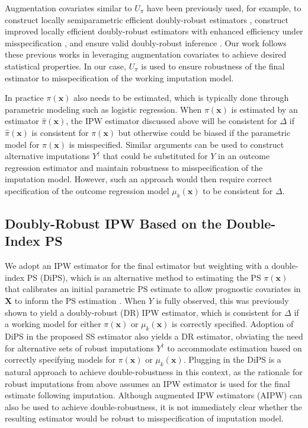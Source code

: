 \documentclass[useAMS,referee,usenatbib]{biom}
\def\bx{\mathbf{x}}
\def\bX{\mathbf{X}}
\def\Ydag{Y^{\dagger}}
\def\pihat{\widehat{\pi}}
\begin{document}
Augmentation covariates similar to $U_{\pi}$ have been previously used, for example, to construct locally semiparametric efficient doubly-robust estimators 
\citep{van2006targeted,bang2005doubly}, construct improved locally efficient doubly-robust estimators 
with enhanced efficiency under misspecification \citep{rotnitzky2012improved}, and ensure valid doubly-robust inference \citep{benkeser2017doubly}.
Our work follows these previous works in leveraging augmentation covariates to achieve desired statistical properties.
In our case, $U_{\pi}$ is used to ensure robustness of the final estimator to misspecification of the working imputation model.

In practice $\pi(\bx)$ also needs to be estimated, which is typically done through parametric modeling such as logistic regression.  When $\pi(\bx)$ is estimated by an estimator $\pihat(\bx)$, the IPW estimator discussed above will be consistent for $\Delta$ if $\pihat(\bx)$ is consistent for $\pi(\bx)$ but otherwise could be biased if the parametric model for $\pi(\bx)$ is misspecified.  
Similar arguments can be used to construct alternative imputations $\Ydag$ that could be substituted for $Y$ in an outcome regression estimator and maintain robustness to misspecification of the imputation model.  However, such an approach would then require correct specification of the outcome regression model $\mu_k(\bx)$ to be consistent for $\Delta$.  

\subsection{Doubly-Robust IPW Based on the Double-Index PS}
We adopt an IPW estimator for the final estimator but weighting with a double-index PS (DiPS), which is an alternative
method to estimating the PS $\pi(\bx)$ that calibrates an initial parametric PS estimate to allow prognostic covariates in $\bX$
to inform the PS estimation \citep{cheng2017estimating}.  
When $Y$ is fully observed, this was previously 
shown to yield a doubly-robust (DR) IPW estimator, which is consistent for $\Delta$ if a working model for either
$\pi(\bx)$ or $\mu_k(\bx)$ is correctly specified.  Adoption of DiPS in the proposed SS estimator also 
yields a DR estimator, obviating the need for alternative sets of robust imputations $\Ydag$ to accommodate estimation based on correctly
specifying models for $\pi(\bx)$ or $\mu_k(\bx)$.
Plugging in the DiPS is a natural approach to achieve double-robustness in this context,
as the rationale for robust imputations from above assumes an IPW estimator is used for the final estimate following imputation.  
Although augmented IPW estimators (AIPW) \citep{robins1994estimation} can also be used to achieve double-robustness, it
is not immediately clear whether the resulting estimator would be robust to misspecification of imputation model.
\end{document}
